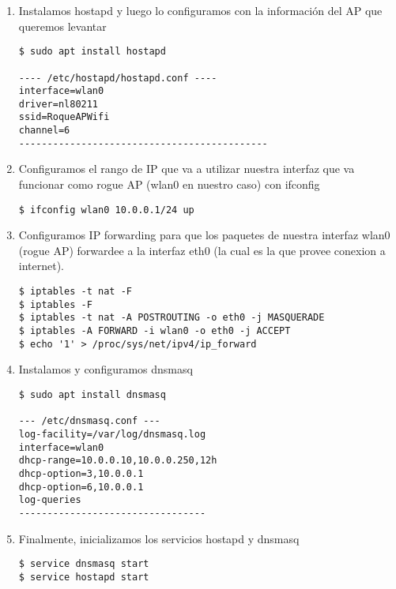 \begin{enumerate}

\item Instalamos hostapd y luego lo configuramos con la información del AP que queremos levantar
	
\begin{lstlisting}[style=base]
$ sudo apt install hostapd

---- /etc/hostapd/hostapd.conf ----
interface=wlan0
driver=nl80211
ssid=RoqueAPWifi
channel=6
--------------------------------------------
\end{lstlisting}
		
\item Configuramos el rango de IP que va a utilizar nuestra interfaz que va funcionar como rogue AP (wlan0 en nuestro caso) con ifconfig

\begin{lstlisting}[style=base]
$ ifconfig wlan0 10.0.0.1/24 up
\end{lstlisting}

\item Configuramos IP forwarding para que los paquetes de nuestra interfaz wlan0 (rogue AP) forwardee a la interfaz eth0 (la cual es la que provee conexion a internet).

\begin{lstlisting}[style=base]
$ iptables -t nat -F
$ iptables -F
$ iptables -t nat -A POSTROUTING -o eth0 -j MASQUERADE
$ iptables -A FORWARD -i wlan0 -o eth0 -j ACCEPT
$ echo '1' > /proc/sys/net/ipv4/ip_forward
\end{lstlisting}

\item Instalamos y configuramos dnsmasq

\begin{lstlisting}[style=base]
$ sudo apt install dnsmasq

--- /etc/dnsmasq.conf ---
log-facility=/var/log/dnsmasq.log
interface=wlan0
dhcp-range=10.0.0.10,10.0.0.250,12h
dhcp-option=3,10.0.0.1
dhcp-option=6,10.0.0.1
log-queries
---------------------------------

\end{lstlisting}

\item Finalmente, inicializamos los servicios hostapd y dnsmasq

\begin{lstlisting}[style=base]
$ service dnsmasq start	
$ service hostapd start
\end{lstlisting}
	
\end{enumerate}
	
